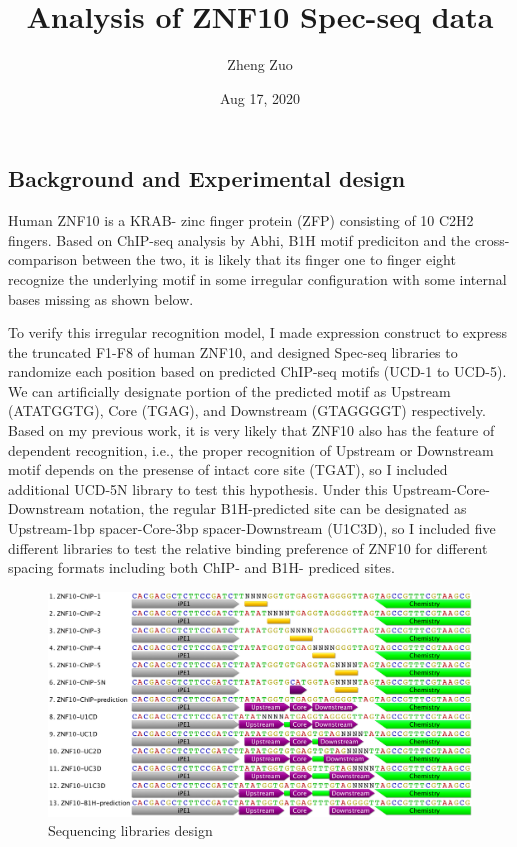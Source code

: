 \documentclass[
]{article}
\title{Analysis of ZNF10 Spec-seq data}
\author{Zheng Zuo}
\date{Aug 17, 2020}
\begin{document}
\maketitle

{
\setcounter{tocdepth}{2}
\tableofcontents
}
\hypertarget{background-and-experimental-design}{%
\subsection{Background and Experimental
design}\label{background-and-experimental-design}}

Human ZNF10 is a KRAB- zinc finger protein (ZFP) consisting of 10 C2H2
fingers. Based on ChIP-seq analysis by Abhi, B1H motif prediciton and
the cross-comparison between the two, it is likely that its finger one
to finger eight recognize the underlying motif in some irregular
configuration with some internal bases missing as shown below.

To verify this irregular recognition model, I made expression construct
to express the truncated F1-F8 of human ZNF10, and designed Spec-seq
libraries to randomize each position based on predicted ChIP-seq motifs
(UCD-1 to UCD-5). We can artificially designate portion of the predicted
motif as Upstream (ATATGGTG), Core (TGAG), and Downstream (GTAGGGGT)
respectively. Based on my previous work, it is very likely that ZNF10
also has the feature of dependent recognition, i.e., the proper
recognition of Upstream or Downstream motif depends on the presense of
intact core site (TGAT), so I included additional UCD-5N library to test
this hypothesis. Under this Upstream-Core-Downstream notation, the
regular B1H-predicted site can be designated as Upstream-1bp
spacer-Core-3bp spacer-Downstream (U1C3D), so I included five different
libraries to test the relative binding preference of ZNF10 for different
spacing formats including both ChIP- and B1H- prediced sites.

\begin{figure}
\centering
\includegraphics{ZNF10 libraries design.png}
\caption{Sequencing libraries design}
\end{figure}
\end{document}
